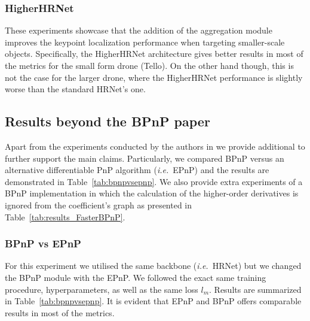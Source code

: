 \subsubsection{HigherHRNet}
These experiments showcase that the addition of the aggregation module improves the keypoint localization performance when targeting smaller-scale objects. 
Specifically, the HigherHRNet architecture gives better results in most of the metrics for the small form drone (Tello). 
On the other hand though, this is not the case for the larger drone, where the HigherHRNet performance is slightly worse than the standard HRNet's one. 

\subsection{Results beyond the BPnP paper}
Apart from the experiments conducted by the authors in \cite{chen2020end} we provide additional to further support the main claims. 
Particularly, we compared BPnP versus an alternative differentiable PnP algorithm (\textit{i.e.}~EPnP) and the results are demonstrated in Table~\ref{tab:bpnpvsepnp}. 
We also provide extra experiments of a BPnP implementation in which the calculation of the higher-order derivatives is ignored from the coefficient's graph as presented in Table~\ref{tab:results_FasterBPnP}.
\subsubsection{BPnP vs EPnP}
For this experiment we utilised the same backbone (\textit{i.e.}~HRNet) but we changed the BPnP module with the EPnP. 
We followed the exact same training procedure, hyperparameters, as well as the same loss $l_m$. 
Results are summarized in Table~\ref{tab:bpnpvsepnp}.
It is evident that EPnP and BPnP offers comparable results in most of the metrics. 

